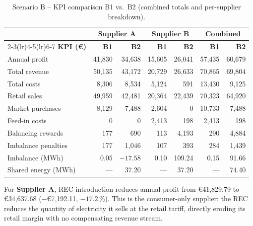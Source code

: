 \begin{table}[htbp]
\centering
\caption{Scenario B -- KPI comparison B1 vs.\ B2 (combined totals and
         per-supplier breakdown).}
\label{tab:B_comparison}
\renewcommand{\arraystretch}{1.35}
\begin{tabular}{@{}lrrrrrr@{}}
\toprule
 & \multicolumn{2}{c}{\textbf{Supplier A}} & \multicolumn{2}{c}{\textbf{Supplier B}} & \multicolumn{2}{c}{\textbf{Combined}} \\
\cmidrule(lr){2-3}\cmidrule(lr){4-5}\cmidrule(lr){6-7}
\textbf{KPI (€)}        & \textbf{B1}   & \textbf{B2}   & \textbf{B1}   & \textbf{B2}   & \textbf{B1}   & \textbf{B2} \\
\midrule
Annual profit           & 41{,}830      & 34{,}638      & 15{,}605      & 26{,}041      & 57{,}435      & 60{,}679 \\
Total revenue           & 50{,}135      & 43{,}172      & 20{,}729      & 26{,}633      & 70{,}865      & 69{,}804 \\
Total costs             & 8{,}306       & 8{,}534       & 5{,}124       & 591           & 13{,}430      & 9{,}125  \\
Retail sales            & 49{,}959      & 42{,}481      & 20{,}364      & 22{,}439      & 70{,}323      & 64{,}920 \\
Market purchases        & 8{,}129       & 7{,}488       & 2{,}604       & 0             & 10{,}733      & 7{,}488  \\
Feed-in costs           & 0             & 0             & 2{,}413       & 198           & 2{,}413       & 198      \\
Balancing rewards       & 177           & 690           & 113           & 4{,}193       & 290           & 4{,}884  \\
Imbalance penalties     & 177           & 1{,}046       & 107           & 393           & 284           & 1{,}439  \\
\addlinespace
Imbalance (MWh)         & 0.05          & $-17.58$      & 0.10          & 109.24        & 0.15          & 91.66   \\
Shared energy (MWh)     & ---           & 37.20         & ---           & 37.20         & ---           & 74.40   \\
\bottomrule
\end{tabular}
\end{table}

For \textbf{Supplier A}, REC introduction reduces annual profit from
€41{,}829.79 to €34{,}637.68 ($-$€7{,}192.11, $-17.2$\,\%).  This is the
consumer-only supplier: the REC reduces the quantity of electricity it sells
at the retail tariff, directly eroding its retail margin with no compensating
revenue stream.

